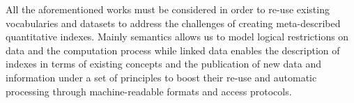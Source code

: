 All the aforementioned works must be considered in order to re-use existing vocabularies and datasets to address 
the challenges of creating meta-described quantitative indexes. Mainly semantics allows us to model logical restrictions 
on data and the computation process while linked data enables the description of indexes in terms of existing concepts and 
the publication of new data and information under a set of principles to boost their re-use and automatic 
processing through machine-readable formats and access protocols.

